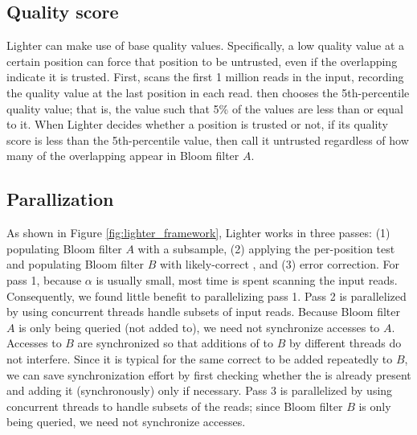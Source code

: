 \documentclass[10pt]{article}
\begin{document}


\subsection*{Quality score}
Lighter can make use of base quality values.  Specifically, a low quality value at a certain position can force that position to be untrusted, even if the overlapping \kmers indicate it is trusted.  First, \tool scans the first 1 million reads in the input, recording the quality value at the last position in each read.  \tool then chooses the 5th-percentile quality value; that is, the value such that 5\% of the values are less than or equal to it.  When Lighter decides whether a position is trusted or not, if its quality score is less than the 5th-percentile value, then call it untrusted regardless of how many of the overlapping \kmers appear in Bloom filter $A$.

\subsection*{Parallization} 
As shown in Figure \ref{fig:lighter_framework}, Lighter works in three passes: (1) populating Bloom filter $A$ with a \kmer subsample, (2) applying the per-position test and populating Bloom filter $B$ with likely-correct \kmers, and (3) error correction.  For pass 1, because $\alpha$ is usually small, most time is spent scanning the input reads.  Consequently, we found little benefit to parallelizing pass 1.  Pass 2 is parallelized by using concurrent threads handle subsets of input reads.  Because Bloom filter $A$ is only being queried (not added to), we need not synchronize accesses to $A$.  Accesses to $B$ are synchronized so that additions of \kmers to $B$ by different threads do not interfere.  Since it is typical for the same correct \kmer to be added repeatedly to $B$, we can save synchronization effort by first checking whether the \kmer is already present and adding it (synchronously) only if necessary.  Pass 3 is parallelized by using concurrent threads to handle subsets of the reads; since Bloom filter $B$ is only being queried, we need not synchronize accesses.
\end{document}
